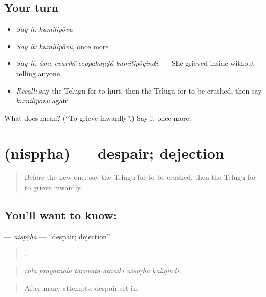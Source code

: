 \subsection*{Your turn}
\begin{itemize}
\raggedright
  \item \emph{Say it:} \emph{kumilipōvu}
  \item \emph{Say it:} \emph{kumilipōvu}, once more
  \item \emph{Say it:} \emph{āme evarikī ceppakuṇḍā kumilipōyindi.} — She grieved inside without telling anyone.
  \item \emph{Recall:} say the Telugu for to hurt, then the Telugu for to be crushed, then say \emph{kumilipōvu} again
\end{itemize}

\begin{tcolorbox}[breakable,colback=teal!4,colframe=teal!35!black,title={Before you move on}]
What does  mean? (\textquotedblleft{}To grieve inwardly\textquotedblright{}.) Say it once more.
\end{tcolorbox}
\section[\texorpdfstring{\te{నిస్పృహ} (nispṛha)}{నిస్పృహ (nispṛha)}]{ (nispṛha) — despair; dejection}

\label{lesson:TE-C496-nisprha}



\begin{quote}
Before the new one: say the Telugu for to be crushed, then the Telugu for to grieve inwardly.
\end{quote}

\subsection*{You'll want to know: }
\textbf{} — \emph{nispṛha} — \textquotedblleft{}despair; dejection\textquotedblright{}.

\begin{quote}
     .
\end{quote}

\begin{quote}
\emph{cālā prayatnāla taruvāta ataniki nispṛha kaligindi.}
\end{quote}

\begin{quote}
After many attempts, despair set in.
\end{quote}


